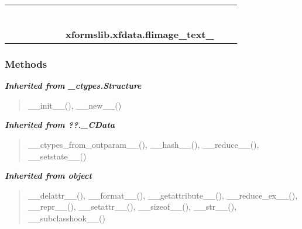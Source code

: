     \label{xformslib:xfdata:flimage_text_}
\begin{tabular}{cccccccccc}
\multicolumn{2}{r}{\settowidth{\BCL}{object}\multirow{2}{\BCL}{object}}
&&
&&
&&
  \\\cline{3-3}
  &&\multicolumn{1}{c|}{}
&&
&&
&&
  \\
\multicolumn{4}{r}{\settowidth{\BCL}{??.\_CData}\multirow{2}{\BCL}{??.\_CData}}
&&
&&
  \\\cline{5-5}
  &&&&\multicolumn{1}{c|}{}
&&
&&
  \\
\multicolumn{6}{r}{\settowidth{\BCL}{\_ctypes.Structure}\multirow{2}{\BCL}{\_ctypes.Structure}}
&&
  \\\cline{7-7}
  &&&&&&\multicolumn{1}{c|}{}
&&
  \\
&&&&&&\multicolumn{2}{l}{\textbf{xformslib.xfdata.flimage\_text\_}}
\end{tabular}



  \subsubsection{Methods}


\large{\textbf{\textit{Inherited from \_ctypes.Structure}}}

\begin{quote}
\_\_init\_\_(), \_\_new\_\_()
\end{quote}

\large{\textbf{\textit{Inherited from ??.\_CData}}}

\begin{quote}
\_\_ctypes\_from\_outparam\_\_(), \_\_hash\_\_(), \_\_reduce\_\_(), \_\_setstate\_\_()
\end{quote}

\large{\textbf{\textit{Inherited from object}}}

\begin{quote}
\_\_delattr\_\_(), \_\_format\_\_(), \_\_getattribute\_\_(), \_\_reduce\_ex\_\_(), \_\_repr\_\_(), \_\_setattr\_\_(), \_\_sizeof\_\_(), \_\_str\_\_(), \_\_subclasshook\_\_()
\end{quote}


